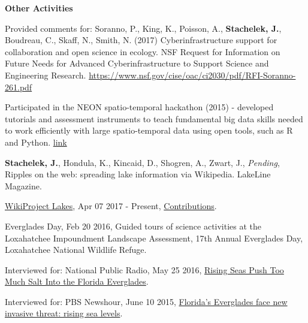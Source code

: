 \documentclass[11pt]{article}
\renewcommand{\section}[1]{\pagebreak[3]%
    \vspace{1.3\baselineskip}%
    \phantomsection\addcontentsline{toc}{section}{#1}%
    \noindent\llap{\scshape\smash{\parbox[t]{\marginparwidth}{\hyphenpenalty=10000\raggedright #1}}}%
    \vspace{-\baselineskip}\par}
\newcommand{\halfblankline}{\quad\vspace{-0.5\baselineskip}\pagebreak[3]}
\begin{document}
\halfblankline

\textbf{Other Activities}
\begin{innerlist}
\item Provided comments for: Soranno, P., King, K., Poisson, A., \textbf{Stachelek, J.}, Boudreau, C., Skaff, N., Smith, N. (2017) Cyberinfrastructure support for collaboration and open science in ecology. NSF Request for Information on Future Needs for Advanced Cyberinfrastructure to Support Science and Engineering Research. \url{https://www.nsf.gov/cise/oac/ci2030/pdf/RFI-Soranno-261.pdf}

\item Participated in the NEON spatio-temporal hackathon (2015) - developed tutorials and assessment instruments to teach fundamental big data skills needed to work efficiently with large spatio-temporal data using open tools, such as R and Python. \href{http://www.neoninc.org/updates-events/update/nsf-biocenters-unite-close-scientific-data-skills-gap-focus-phenology}{link}

\end{innerlist}

\halfblankline

\section{Outreach}

\begin{innerlist}

\item \textbf{Stachelek, J.}, Hondula, K., Kincaid, D., Shogren, A., Zwart, J., \emph{Pending}, Ripples on the web: spreading lake information via Wikipedia. LakeLine Magazine.

 \item \href{https://en.wikipedia.org/wiki/Wikipedia:WikiProject_Lakes}{WikiProject Lakes}, Apr 07 2017 - Present, \href{https://en.wikipedia.org/wiki/Special:Contributions/Jst4}{Contributions}.

  \item Everglades Day, Feb 20 2016, Guided tours of science activities at the Loxahatchee Impoundment Landscape Assessment, 17th Annual Everglades Day, Loxahatchee National Wildlife Refuge.
  
  \item Interviewed for: National Public Radio, May 25 2016, \href{http://www.npr.org/2016/05/25/477014085/rising-seas-push-too-much-salt-into-the-florida-everglades}{Rising Seas Push Too Much Salt Into the Florida Everglades}.
  
  \item Interviewed for: PBS Newshour, June 10 2015, \href{https://www.youtube.com/watch?v=ggOl-vaXIFk}{Florida's Everglades face new invasive threat: rising sea levels}.

\end{innerlist}
\end{document}
